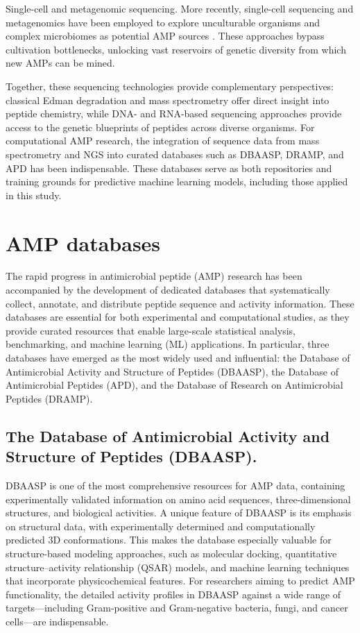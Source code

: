 \documentclass[a4paper,twoside,12pt]{book}
\begin{document}
Single-cell and metagenomic sequencing. More recently, single-cell sequencing and metagenomics have been employed to explore unculturable organisms and complex microbiomes as potential AMP sources \cite{bib:nayfach2016}. These approaches bypass cultivation bottlenecks, unlocking vast reservoirs of genetic diversity from which new AMPs can be mined.

Together, these sequencing technologies provide complementary perspectives: classical Edman degradation and mass spectrometry offer direct insight into peptide chemistry, while DNA- and RNA-based sequencing approaches provide access to the genetic blueprints of peptides across diverse organisms. For computational AMP research, the integration of sequence data from mass spectrometry and NGS into curated databases such as DBAASP, DRAMP, and APD has been indispensable. These databases serve as both repositories and training grounds for predictive machine learning models, including those applied in this study.

\section{AMP databases}

The rapid progress in antimicrobial peptide (AMP) research has been accompanied by the development of dedicated databases that systematically collect, annotate, and distribute peptide sequence and activity information. These databases are essential for both experimental and computational studies, as they provide curated resources that enable large-scale statistical analysis, benchmarking, and machine learning (ML) applications. In particular, three databases have emerged as the most widely used and influential: the Database of Antimicrobial Activity and Structure of Peptides (DBAASP), the Database of Antimicrobial Peptides (APD), and the Database of Research on Antimicrobial Peptides (DRAMP).

\subsection{The Database of Antimicrobial Activity and Structure of Peptides (DBAASP).}
DBAASP \cite{bib:pirtskhalava2021} is one of the most comprehensive resources for AMP data, containing experimentally validated information on amino acid sequences, three-dimensional structures, and biological activities. A unique feature of DBAASP is its emphasis on structural data, with experimentally determined and computationally predicted 3D conformations. This makes the database especially valuable for structure-based modeling approaches, such as molecular docking, quantitative structure–activity relationship (QSAR) models, and machine learning techniques that incorporate physicochemical features. For researchers aiming to predict AMP functionality, the detailed activity profiles in DBAASP against a wide range of targets—including Gram-positive and Gram-negative bacteria, fungi, and cancer cells—are indispensable.
\end{document}
